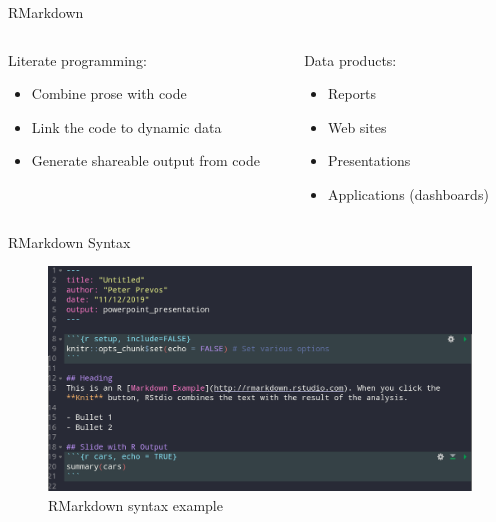 \documentclass[
  ignorenonframetext,
]{beamer}
\providecommand{\tightlist}{%
  \setlength{\itemsep}{0pt}\setlength{\parskip}{0pt}}
\begin{document}
\begin{frame}{RMarkdown}
\protect\hypertarget{rmarkdown}{}
\begin{columns}[T]
\begin{column}{0.48\textwidth}
Literate programming:

\begin{itemize}
\tightlist
\item
  Combine prose with code
\item
  Link the code to dynamic data
\item
  Generate shareable output from code
\end{itemize}
\end{column}

\begin{column}{0.48\textwidth}
Data products:

\begin{itemize}
\tightlist
\item
  Reports
\item
  Web sites
\item
  Presentations
\item
  Applications (dashboards)
\end{itemize}
\end{column}
\end{columns}
\end{frame}

\begin{frame}{RMarkdown Syntax}
\protect\hypertarget{rmarkdown-syntax}{}
\begin{figure}
\centering
\includegraphics{../manuscript/resources/07_data_products/rmarkdown-example.png}
\caption{RMarkdown syntax example}
\end{figure}
\end{frame}
\end{document}
